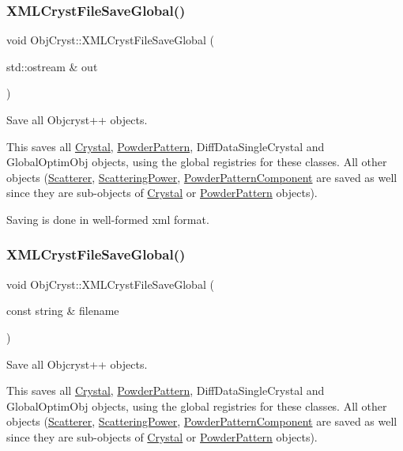 \subsubsection{\texorpdfstring{XMLCrystFileSaveGlobal()}{XMLCrystFileSaveGlobal()}\hspace{0.1cm}{\footnotesize\ttfamily [1/2]}}
{\footnotesize\ttfamily void Obj\+Cryst\+::\+X\+M\+L\+Cryst\+File\+Save\+Global (\begin{DoxyParamCaption}\item[{std\+::ostream \&}]{out }\end{DoxyParamCaption})}



Save all Objcryst++ objects. 

This saves all \mbox{\hyperlink{class_obj_cryst_1_1_crystal}{Crystal}}, \mbox{\hyperlink{class_obj_cryst_1_1_powder_pattern}{Powder\+Pattern}}, Diff\+Data\+Single\+Crystal and Global\+Optim\+Obj objects, using the global registries for these classes. All other objects (\mbox{\hyperlink{class_obj_cryst_1_1_scatterer}{Scatterer}}, \mbox{\hyperlink{class_obj_cryst_1_1_scattering_power}{Scattering\+Power}}, \mbox{\hyperlink{class_obj_cryst_1_1_powder_pattern_component}{Powder\+Pattern\+Component}} are saved as well since they are sub-\/objects of \mbox{\hyperlink{class_obj_cryst_1_1_crystal}{Crystal}} or \mbox{\hyperlink{class_obj_cryst_1_1_powder_pattern}{Powder\+Pattern}} objects).

Saving is done in well-\/formed xml format. \mbox{\label{namespace_obj_cryst_af1f43834dd8e606cefe6f8fdc0f79a13}} 
\subsubsection{\texorpdfstring{XMLCrystFileSaveGlobal()}{XMLCrystFileSaveGlobal()}\hspace{0.1cm}{\footnotesize\ttfamily [2/2]}}
{\footnotesize\ttfamily void Obj\+Cryst\+::\+X\+M\+L\+Cryst\+File\+Save\+Global (\begin{DoxyParamCaption}\item[{const string \&}]{filename }\end{DoxyParamCaption})}



Save all Objcryst++ objects. 

This saves all \mbox{\hyperlink{class_obj_cryst_1_1_crystal}{Crystal}}, \mbox{\hyperlink{class_obj_cryst_1_1_powder_pattern}{Powder\+Pattern}}, Diff\+Data\+Single\+Crystal and Global\+Optim\+Obj objects, using the global registries for these classes. All other objects (\mbox{\hyperlink{class_obj_cryst_1_1_scatterer}{Scatterer}}, \mbox{\hyperlink{class_obj_cryst_1_1_scattering_power}{Scattering\+Power}}, \mbox{\hyperlink{class_obj_cryst_1_1_powder_pattern_component}{Powder\+Pattern\+Component}} are saved as well since they are sub-\/objects of \mbox{\hyperlink{class_obj_cryst_1_1_crystal}{Crystal}} or \mbox{\hyperlink{class_obj_cryst_1_1_powder_pattern}{Powder\+Pattern}} objects).

